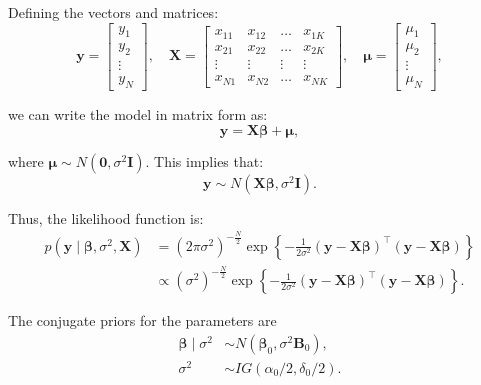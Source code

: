 Defining the vectors and matrices:
\[
\bm{y} = \begin{bmatrix} y_1 \\ y_2 \\ \vdots \\ y_N \end{bmatrix}, \quad 
\bm{X} = \begin{bmatrix} x_{11} & x_{12} & \dots & x_{1K} \\ x_{21} & x_{22} & \dots & x_{2K} \\ \vdots & \vdots & \vdots & \vdots \\ x_{N1} & x_{N2} & \dots & x_{NK} \end{bmatrix}, \quad 
\bm{\mu} = \begin{bmatrix} \mu_1 \\ \mu_2 \\ \vdots \\ \mu_N \end{bmatrix},
\]

we can write the model in matrix form as:
\[
\bm{y} = \bm{X} \bm{\beta} + \bm{\mu},
\]

where \( \bm{\mu} \sim N(\bm{0}, \sigma^2 \bm{I}) \). This implies that:
\[
\bm{y} \sim N(\bm{X} \bm{\beta}, \sigma^2 \bm{I}).
\]

Thus, the likelihood function is:
\begin{align*}
	p({\bm{y}}\mid \bm{\beta}, \sigma^2, {{\bm{X}}}) & = (2\pi\sigma^2)^{-\frac{N}{2}} \exp \left\{-\frac{1}{2\sigma^2} ({\bm{y}} - {\bm{X}}\bm{\beta})^{\top}({\bm{y}} - {\bm{X}}\bm{\beta}) \right\}  \\
	& \propto (\sigma^2)^{-\frac{N}{2}} \exp \left\{-\frac{1}{2\sigma^2} ({\bm{y}} - {\bm{X}}\bm{\beta})^{\top}({\bm{y}} - {\bm{X}}\bm{\beta}) \right\}.
\end{align*}

The conjugate priors for the parameters are
\begin{align*}
	\bm{\beta}\mid \sigma^2 & \sim N(\bm{\beta}_0, \sigma^2 {\bm{B}}_0),\\
	\sigma^2 & \sim IG(\alpha_0/2, \delta_0/2).
\end{align*}

